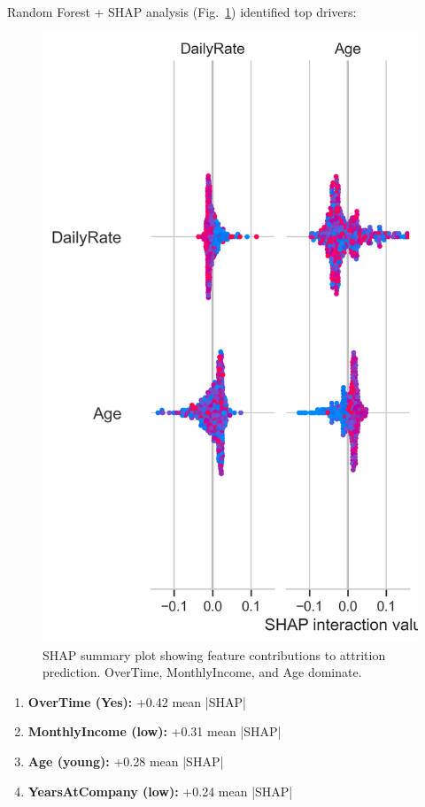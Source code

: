 \documentclass[conference]{IEEEtran}
\begin{document}
Random Forest + SHAP analysis (Fig.~\ref{fig:shap_summary}) identified top drivers:

\begin{figure}[!t]
  \centering
  \includegraphics[width=\linewidth]{shap_summary.png}
  \caption{SHAP summary plot showing feature contributions to attrition prediction. OverTime, MonthlyIncome, and Age dominate.}
  \label{fig:shap_summary}
\end{figure}

\begin{enumerate}
    \item \textbf{OverTime (Yes):} +0.42 mean |SHAP|
    \item \textbf{MonthlyIncome (low):} +0.31 mean |SHAP|
    \item \textbf{Age (young):} +0.28 mean |SHAP|
    \item \textbf{YearsAtCompany (low):} +0.24 mean |SHAP|
\end{enumerate}
\end{document}
